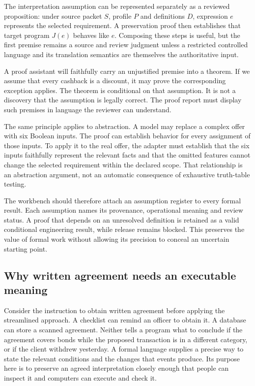 \documentclass[12pt,a4paper,oneside,openany]{book}
\begin{document}
The interpretation assumption can be represented separately as a reviewed
proposition: under source packet $S$, profile $P$ and definitions $D$, expression
$e$ represents the selected requirement. A preservation proof then establishes
that target program $J(e)$ behaves like $e$. Composing these steps is useful, but
the first premise remains a source and review judgment unless a restricted
controlled language and its translation semantics are themselves the authoritative
input.

A proof assistant will faithfully carry an unjustified premise into a theorem.
If we assume that every cashback is a discount, it may prove the corresponding
exception applies. The theorem is conditional on that assumption. It is not a
discovery that the assumption is legally correct. The proof report must display
such premises in language the reviewer can understand.

The same principle applies to abstraction. A model may replace a complex offer
with six Boolean inputs. The proof can establish behavior for every assignment
of those inputs. To apply it to the real offer, the adapter must establish that
the six inputs faithfully represent the relevant facts and that the omitted
features cannot change the selected requirement within the declared scope.
That relationship is an abstraction argument, not an automatic consequence of
exhaustive truth-table testing.

The workbench should therefore attach an assumption register to every formal
result. Each assumption names its provenance, operational meaning and review
status. A proof that depends on an unresolved definition is retained as a valid
conditional engineering result, while release remains blocked. This preserves
the value of formal work without allowing its precision to conceal an uncertain
starting point.

\subsection{Why written agreement needs an executable meaning}
\label{merge:P-01a-language-lesson:00}

\label{sec:language-lesson}

Consider the instruction to obtain written agreement before applying the
streamlined approach. A checklist can remind an officer to obtain it. A database
can store a scanned agreement. Neither tells a program what to conclude if the
agreement covers bonds while the proposed transaction is in a different category,
or if the client withdrew yesterday. A formal language supplies a precise way
to state the relevant conditions and the changes that events produce. Its
purpose here is to preserve an agreed interpretation closely enough that people
can inspect it and computers can execute and check it.
\end{document}
